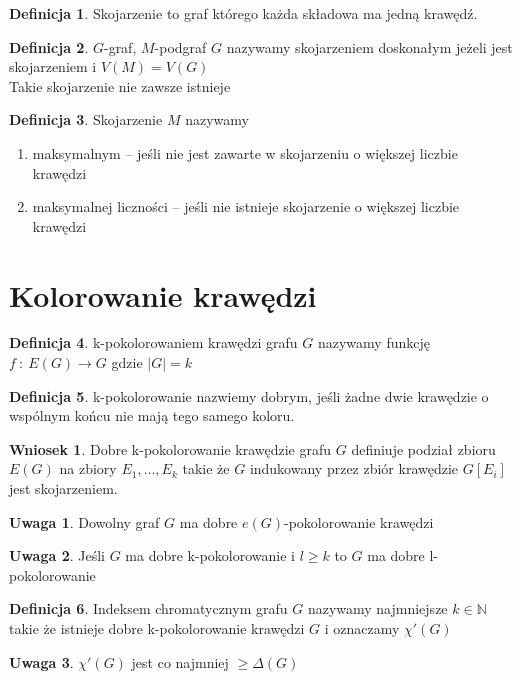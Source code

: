 \documentclass[12pt,a4paper]{article}
\theoremstyle{definition}
\newtheorem{df}{Definicja}
\newtheorem{wniosek}{Wniosek}
\newtheorem{uwaga}{Uwaga}
\begin{document}
\begin{df}
Skojarzenie to graf którego każda składowa ma jedną krawędź.
\end{df}
\begin{df}
$G$-graf, $M$-podgraf $G$ nazywamy skojarzeniem doskonałym jeżeli jest skojarzeniem i $V(M)=V(G)$\\
Takie skojarzenie nie zawsze istnieje
\end{df}
\begin{df}
Skojarzenie $M$ nazywamy 
\begin{enumerate}
	\item maksymalnym -- jeśli nie jest zawarte w skojarzeniu o większej liczbie krawędzi
	\item maksymalnej liczności -- jeśli nie istnieje skojarzenie o większej liczbie krawędzi
\end{enumerate}
\end{df}

\section{Kolorowanie krawędzi}
\begin{df}
k-pokolorowaniem krawędzi grafu $G$ nazywamy funkcję $f~:~ E(G) \to G$ gdzie $|G| = k$
\end{df}

\begin{df}
k-pokolorowanie nazwiemy dobrym, jeśli żadne dwie krawędzie o wspólnym końcu nie mają tego samego koloru.
\begin{wniosek}
Dobre k-pokolorowanie krawędzie grafu $G$ definiuje podział zbioru $E(G)$ na zbiory $E_1,\dots,E_k$ takie że $G$ indukowany przez zbiór krawędzie $G[E_i]$ jest skojarzeniem.
\end{wniosek}
\begin{uwaga}
Dowolny graf $G$ ma dobre $e(G)$-pokolorowanie krawędzi
\end{uwaga}
\begin{uwaga}
Jeśli $G$ ma dobre k-pokolorowanie i $l\geqslant k$ to $G$ ma dobre l-pokolorowanie
\end{uwaga}
\end{df}

\begin{df}
Indeksem chromatycznym grafu $G$ nazywamy najmniejsze $k\in\mathbb{N}$ takie że istnieje dobre k-pokolorowanie krawędzi $G$ i oznaczamy $\chi'(G)$
\begin{uwaga}
$\chi'(G)$ jest co najmniej $\geqslant \Delta(G)$
\end{uwaga}
\end{df}
\end{document}
